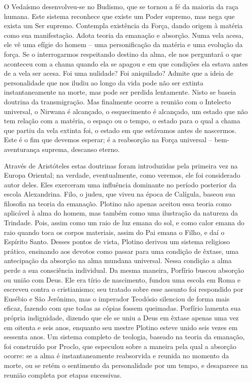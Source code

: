 \documentclass[11pt,a5paper,twoside,openany]{book}
\begin{document}
O Vedaísmo desenvolveu-se no Budismo, que se tornou a fé da maioria da raça humana. Este sistema reconhece que existe um Poder supremo, mas nega que exista um Ser supremo. Contempla existência da Força, dando origem à matéria como sua manifestação. Adota teoria da emanação e absorção. Numa vela acesa, ele vê uma efígie do homem – uma personificação da matéria e uma evolução da força. Se o interrogarmos respeitando destino da alma, ele nos perguntará o que aconteceu com a chama quando ela se apagou e em que condições ela estava antes de a vela ser acesa. Foi uma nulidade? Foi aniquilado? Admite que a ideia de personalidade que nos iludiu ao longo da vida pode não ser extinta instantaneamente na morte, mas pode ser perdida lentamente. Nisto se baseia doutrina da transmigração. Mas finalmente ocorre a reunião com o Intelecto universal, o Nirwana é alcançado, o esquecimento é alcançado, um estado que não tem relação com a matéria, o espaço ou o tempo, o estado para o qual a chama que partiu da vela extinta foi, o estado em que estávamos antes de nascermos. Este é o fim que devemos esperar; é a reabsorção na Força universal – bem-aventurança suprema, descanso eterno.

Através de Aristóteles estas doutrinas foram introduzidas pela primeira vez na Europa Oriental; na verdade, eventualmente, como veremos, ele foi considerado autor deles. Eles exerceram uma influência dominante no período posterior da escola Alexandrina. Filo, o judeu, que viveu na época de Calígula, baseou sua filosofia na teoria da emanação. Plotino não apenas aceitou essa teoria como aplicável à alma do homem, mas também como uma ilustração da natureza da Trindade. Pois, assim como um raio de luz emana do sol, e como calor emana do raio quando toca os corpos materiais, assim do Pai emana o Filho, e daí o Espírito Santo. Desses pontos de vista, Plotino derivou um sistema religioso prático, ensinando aos devotos como passar para uma condição de êxtase, uma antecipação da absorção na alma mundana universal. Nessa condição a alma perde a sua consciência individual. Da mesma maneira, Porfírio buscou absorção ou união com Deus. Ele era tírio de nascimento, fundou uma escola em Roma e escreveu contra o cristianismo; seu tratado sobre esse assunto foi respondido por Eusébio e São Jerônimo, mas o imperador Teodósio silenciou de forma mais eficaz, fazendo com que todas as cópias fossem queimadas. Porfírio lamenta sua própria indignidade, dizendo que ele se uniu a Deus em êxtase apenas uma vez em oitenta e seis anos, enquanto seu mestre Plotino esteve unido seis vezes em sessenta anos. Um sistema completo de teologia, baseado na teoria da emanação, foi construído por Proclo, que especulou sobre a maneira pela qual a absorção ocorre: se a alma é instantaneamente reabsorvida e reunida no momento da morte, ou se retém o sentimento da personalidade por um tempo, e desaparece na reunião completa por etapas sucessivas.
\end{document}
